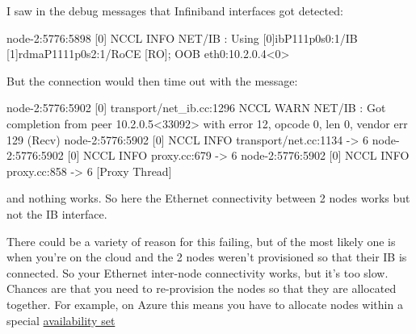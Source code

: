 \documentclass[
]{report}
\newenvironment{Shaded}{\begin{snugshade}}{\end{snugshade}}
\newcommand{\AttributeTok}[1]{\textcolor[rgb]{0.40,0.45,0.13}{#1}}
\newcommand{\ErrorTok}[1]{\textcolor[rgb]{0.68,0.00,0.00}{#1}}
\newcommand{\ExtensionTok}[1]{\textcolor[rgb]{0.00,0.23,0.31}{#1}}
\newcommand{\KeywordTok}[1]{\textcolor[rgb]{0.00,0.23,0.31}{#1}}
\newcommand{\NormalTok}[1]{\textcolor[rgb]{0.00,0.23,0.31}{#1}}
\newcommand{\OperatorTok}[1]{\textcolor[rgb]{0.37,0.37,0.37}{#1}}
\newcommand{\PreprocessorTok}[1]{\textcolor[rgb]{0.68,0.00,0.00}{#1}}
\newcommand{\SpecialStringTok}[1]{\textcolor[rgb]{0.13,0.47,0.30}{#1}}
\begin{document}
I saw in the debug messages that Infiniband interfaces got detected:

\begin{Shaded}
\begin{Highlighting}[]
\ExtensionTok{node{-}2:5776:5898} \PreprocessorTok{[}\SpecialStringTok{0}\PreprocessorTok{]}\NormalTok{ NCCL INFO NET/IB : Using }\PreprocessorTok{[}\SpecialStringTok{0}\PreprocessorTok{]}\NormalTok{ibP111p0s0:1/IB }\PreprocessorTok{[}\SpecialStringTok{1}\PreprocessorTok{]}\NormalTok{rdmaP1111p0s2:1/RoCE }\PreprocessorTok{[}\SpecialStringTok{RO}\PreprocessorTok{]}\KeywordTok{;} \ExtensionTok{OOB}\NormalTok{ eth0:10.2.0.4}\OperatorTok{\textless{}}\NormalTok{0}\OperatorTok{\textgreater{}}
\end{Highlighting}
\end{Shaded}

But the connection would then time out with the message:

\begin{Shaded}
\begin{Highlighting}[]
\ExtensionTok{node{-}2:5776:5902} \PreprocessorTok{[}\SpecialStringTok{0}\PreprocessorTok{]}\NormalTok{ transport/net\_ib.cc:1296 NCCL WARN NET/IB : Got completion from peer 10.2.0.5}\OperatorTok{\textless{}}\NormalTok{33092}\OperatorTok{\textgreater{}}\NormalTok{ with error 12, opcode 0, len}
\ExtensionTok{0,}\NormalTok{ vendor err 129 }\ErrorTok{(}\ExtensionTok{Recv}\KeywordTok{)}
\ExtensionTok{node{-}2:5776:5902} \PreprocessorTok{[}\SpecialStringTok{0}\PreprocessorTok{]}\NormalTok{ NCCL INFO transport/net.cc:1134 }\AttributeTok{{-}}\OperatorTok{\textgreater{}}\NormalTok{ 6}
\ExtensionTok{node{-}2:5776:5902} \PreprocessorTok{[}\SpecialStringTok{0}\PreprocessorTok{]}\NormalTok{ NCCL INFO proxy.cc:679 }\AttributeTok{{-}}\OperatorTok{\textgreater{}}\NormalTok{ 6}
\ExtensionTok{node{-}2:5776:5902} \PreprocessorTok{[}\SpecialStringTok{0}\PreprocessorTok{]}\NormalTok{ NCCL INFO proxy.cc:858 }\AttributeTok{{-}}\OperatorTok{\textgreater{}}\NormalTok{ 6 [Proxy Thread]}
\end{Highlighting}
\end{Shaded}

and nothing works. So here the Ethernet connectivity between 2 nodes
works but not the IB interface.

There could be a variety of reason for this failing, but of the most
likely one is when you're on the cloud and the 2 nodes weren't
provisioned so that their IB is connected. So your Ethernet inter-node
connectivity works, but it's too slow. Chances are that you need to
re-provision the nodes so that they are allocated together. For example,
on Azure this means you have to allocate nodes within a special
\href{https://learn.microsoft.com/en-us/azure/virtual-machines/availability-set-overview?source=recommendations}{availability
set}
\end{document}
